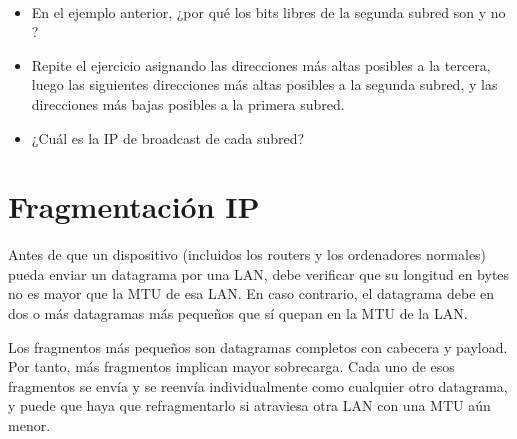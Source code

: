\begin{exercise}\ \\[-0.5cm]
\begin{itemize}
\item En el ejemplo anterior, ¿por qué los bits libres de la segunda subred son  
y no ?\\[-0.4cm]

\item Repite el ejercicio asignando las direcciones más altas posibles a la tercera,
  luego las siguientes direcciones más altas posibles a la segunda subred, 
  y las direcciones más bajas posibles a la primera subred.\\[-0.4cm]
  
\item ¿Cuál es la IP de broadcast de cada subred?
\end{itemize}
\end{exercise}


% 
\section{Fragmentación IP}\label{sec:layer3:ip_fragmentation}
\label{sec:layer3:fragmentation}

Antes de que un dispositivo (incluidos los routers y los ordenadores normales)
pueda enviar un datagrama por una LAN, debe verificar que su longitud en bytes 
no es mayor que la MTU de esa LAN. En caso contrario, el datagrama debe 
 en dos o más datagramas más pequeños que sí quepan en la MTU de la LAN.

Los fragmentos más pequeños son datagramas completos con cabecera y payload. Por tanto, 
más fragmentos implican mayor sobrecarga. Cada uno de esos fragmentos se envía 
y se reenvía individualmente como cualquier otro datagrama, y puede que haya que refragmentarlo 
si atraviesa otra LAN con una MTU aún menor.

